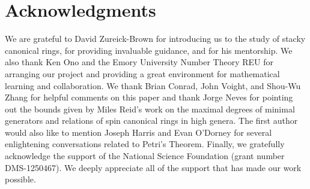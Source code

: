 \documentclass{amsart}
\theoremstyle{plain}
\theoremstyle{definition}
\theoremstyle{remark}
\numberwithin{equation}{section}
\begin{document}

\section{Acknowledgments}
We are grateful to David Zureick-Brown for introducing us to the
study of stacky canonical rings, for providing invaluable guidance,
and for his mentorship. We also thank Ken Ono and the Emory
University Number Theory REU for arranging our project and
providing a great environment for mathematical learning and
collaboration. We thank Brian Conrad, John Voight, and Shou-Wu
Zhang for helpful comments on this paper and thank Jorge Neves
for pointing out the bounds given by Miles Reid's work on the
maximal degrees of minimal generators and relations of spin
canonical rings in high genera. The first author would also like to
mention Joseph Harris and Evan O'Dorney for several enlightening
conversations related to Petri's Theorem. Finally, we gratefully
acknowledge the support of the National Science Foundation (grant
number DMS-1250467). We deeply appreciate all of the support that
has made our work possible.


\nocite{*}
{}

\end{document}
